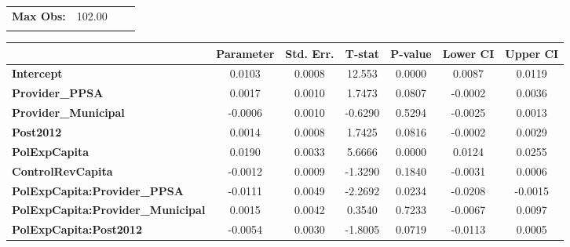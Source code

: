 \begin{center}
\begin{tabular}{lclc}
\textbf{Max Obs:}                                  &       102.00       & \textbf{                     }   &                  \\
\textbf{}                                          &                    & \textbf{                     }   &                  \\
\bottomrule
\end{tabular}
\begin{tabular}{lcccccc}
                                                   & \textbf{Parameter} & \textbf{Std. Err.} & \textbf{T-stat} & \textbf{P-value} & \textbf{Lower CI} & \textbf{Upper CI}  \\
\midrule
\textbf{Intercept}                                 &       0.0103       &       0.0008       &      12.553     &      0.0000      &       0.0087      &       0.0119       \\
\textbf{Provider\_PPSA}                            &       0.0017       &       0.0010       &      1.7473     &      0.0807      &      -0.0002      &       0.0036       \\
\textbf{Provider\_Municipal}                       &      -0.0006       &       0.0010       &     -0.6290     &      0.5294      &      -0.0025      &       0.0013       \\
\textbf{Post2012}                                  &       0.0014       &       0.0008       &      1.7425     &      0.0816      &      -0.0002      &       0.0029       \\
\textbf{PolExpCapita}                              &       0.0190       &       0.0033       &      5.6666     &      0.0000      &       0.0124      &       0.0255       \\
\textbf{ControlRevCapita}                          &      -0.0012       &       0.0009       &     -1.3290     &      0.1840      &      -0.0031      &       0.0006       \\
\textbf{PolExpCapita:Provider\_PPSA}               &      -0.0111       &       0.0049       &     -2.2692     &      0.0234      &      -0.0208      &      -0.0015       \\
\textbf{PolExpCapita:Provider\_Municipal}          &       0.0015       &       0.0042       &      0.3540     &      0.7233      &      -0.0067      &       0.0097       \\
\textbf{PolExpCapita:Post2012}                     &      -0.0054       &       0.0030       &     -1.8005     &      0.0719      &      -0.0113      &       0.0005       \\

\end{tabular}
\end{center}
